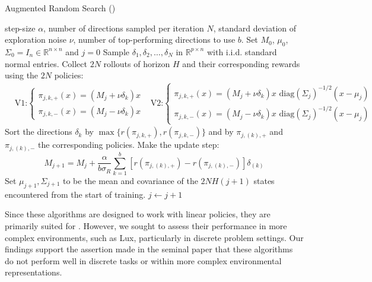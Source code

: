\begin{algorithm}[htbp]
\caption{Augmented Random Search (\cite{mania2018simple})}
\begin{algorithmic}[1]
\State {} step-size $\alpha$, number of directions sampled per iteration $N$, standard deviation of exploration noise $\nu$, number of top-performing directions to use $b$.
\State {} Set $M_0$, $\mu_0$, $\Sigma_0 = I_n \in \mathbb{R}^{n \times n}$ and $j = 0$
    \State Sample $\delta_1, \delta_2, \ldots, \delta_N$ in $\mathbb{R}^{p \times n}$ with i.i.d. standard normal entries.
    \State Collect $2N$ rollouts of horizon $H$ and their corresponding rewards using the $2N$ policies:
    \begin{align*}
    &\text{V1:}
        \begin{cases} 
            \pi_{j,k,+}(x) = (M_j + \nu \delta_k)x \\
            \pi_{j,k,-}(x) = (M_j - \nu \delta_k)x
        \end{cases}
    &\text{V2:}
        \begin{cases} 
            \pi_{j,k,+}(x) = (M_j + \nu \delta_k)x\text{ diag}(\Sigma_j)^{-1/2}(x - \mu_j) \\
            \pi_{j,k,-}(x) = (M_j - \nu \delta_k)x\text{ diag}(\Sigma_j)^{-1/2}(x - \mu_j)
        \end{cases}
    \end{align*}
    \State Sort the directions $\delta_k$ by $\max\{r(\pi_{j,k,+}), r(\pi_{j,k,-})\}$ and by $\pi_{j,(k),+}$ and $\pi_{j,(k),-}$ the corresponding policies.
    \State Make the update step:
    $$
    M_{j+1} = M_j + \frac{\alpha}{b\sigma_R} \sum_{k=1}^b \left [r(\pi_{j,(k),+}) - r(\pi_{j,(k),-}) \right ] \delta_{(k)}
    $$
    \State Set $\mu_{j+1}, \Sigma_{j+1}$ to be the mean and covariance of the $2N H (j + 1)$ states encountered from the start of training.
    \State $j \leftarrow j + 1$
\EndWhile
\end{algorithmic}
\end{algorithm}

\bigskip

\noindent Since these algorithms are designed to work with linear policies, they are primarily suited for . However, we sought to assess their performance in more complex environments, such as Lux, particularly in discrete problem settings. Our findings support the assertion made in the seminal paper that these algorithms do not perform well in discrete tasks or within more complex environmental representations. 

